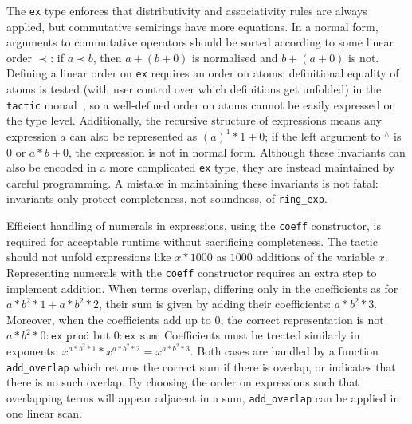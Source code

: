 \documentclass{llncs}
\newcommand{\lean}[1]{\texttt{#1}\xspace} %
\newcommand{\ex}{\lean{ex}}
\newcommand{\pow}{{${}^\wedge$}\xspace}
\newcommand{\ringexp}{\lean{ring\_exp}}
\begin{document}
The \ex type enforces that distributivity and associativity rules are always applied,
but commutative semirings have more equations.
In a normal form, arguments to commutative operators should be sorted according to some linear order $\prec$: if $a \prec b$, then $a + (b + 0)$ is normalised and $b + (a + 0)$ is not.
Defining a linear order on \ex requires an order on atoms; definitional equality of atoms is tested (with user control over which definitions get unfolded) in the \lean{tactic} monad~\cite{lean-tactics},
so a well-defined order on atoms cannot be easily expressed on the type level.
Additionally, the recursive structure of expressions
means any expression $a$ can also be represented as $(a)^1*1 + 0$;
if the left argument to \pow is $0$ or $a * b + 0$, the expression is not in normal form.
Although these invariants can also be encoded in a more complicated \lean{ex} type,
they are instead maintained by careful programming.
A mistake in maintaining these invariants is not fatal: invariants only protect completeness, not soundness, of \ringexp.

Efficient handling of numerals in expressions, using the \lean{coeff} constructor, is required for acceptable runtime without sacrificing completeness.
The tactic should not unfold expressions like $x * 1000$ as $1000$ additions of the variable $x$.
Representing numerals with the \lean{coeff} constructor requires an extra step to implement addition.
When terms overlap, differing only in the coefficients as for $a * b^2 * 1 + a * b^2 * 2$,
their sum is given by adding their coefficients: $a * b^2 * 3$.
Moreover, when the coefficients add up to $0$, the correct representation is not $a * b^2 * 0 : \lean{ex prod}$ but $0 : \lean{ex sum}$.
Coefficients must be treated similarly in exponents: $x ^ {a * b^2 * 1} * x ^ {a * b^2 * 2} %
= x ^ {a * b^2 * 3}$.
Both cases are handled by a function \lean{add\_overlap} which returns the correct sum if there is overlap,
or indicates that there is no such overlap.
By choosing the order on expressions such that overlapping terms will appear adjacent in a sum,
\lean{add\_overlap} can be applied in one linear scan.
\end{document}
